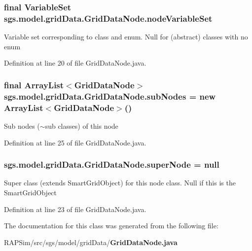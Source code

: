 \subsubsection[{node\-Variable\-Set}]{\setlength{\rightskip}{0pt plus 5cm}final {\bf Variable\-Set} sgs.\-model.\-grid\-Data.\-Grid\-Data\-Node.\-node\-Variable\-Set}\label{classsgs_1_1model_1_1grid_data_1_1_grid_data_node_a6ea2e56fca3ed3c1c6aaa74bfaf37eda}
Variable set corresponding to class and enum. Null for (abstract) classes with no enum 

Definition at line 20 of file Grid\-Data\-Node.\-java.

\subsubsection[{sub\-Nodes}]{\setlength{\rightskip}{0pt plus 5cm}final Array\-List$<${\bf Grid\-Data\-Node}$>$ sgs.\-model.\-grid\-Data.\-Grid\-Data\-Node.\-sub\-Nodes = new Array\-List$<${\bf Grid\-Data\-Node}$>$()}\label{classsgs_1_1model_1_1grid_data_1_1_grid_data_node_a599e1140e6555a4ae0d74a6a669e17d6}
Sub nodes ($\sim$sub classes) of this node 

Definition at line 25 of file Grid\-Data\-Node.\-java.

\subsubsection[{super\-Node}]{ sgs.\-model.\-grid\-Data.\-Grid\-Data\-Node.\-super\-Node = null}\label{classsgs_1_1model_1_1grid_data_1_1_grid_data_node_a94b5b45ce20f7cd33aaba243710a33a6}
Super class (extends Smart\-Grid\-Object) for this node class. Null if this is the Smart\-Grid\-Object 

Definition at line 23 of file Grid\-Data\-Node.\-java.



The documentation for this class was generated from the following file\-:\begin{DoxyCompactItemize}
\item 
R\-A\-P\-Sim/src/sgs/model/grid\-Data/{\bf Grid\-Data\-Node.\-java}\end{DoxyCompactItemize}
